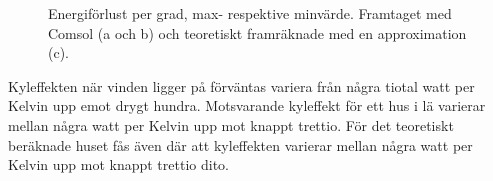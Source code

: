 \begin{figure}[hpbt]
\centering
{}
\vspace{5mm}


\caption{\label{fig:windenergyloss}Energiförlust per grad, max- respektive minvärde.
Framtaget med Comsol (a och b) och teoretiskt framräknade med en approximation (c).}
\end{figure}

Kyleffekten när vinden ligger på förväntas variera från några tiotal watt per Kelvin upp emot drygt hundra. Motsvarande kyleffekt för ett hus i lä varierar mellan några watt per Kelvin upp mot knappt trettio. För det teoretiskt beräknade huset fås även där att kyleffekten varierar mellan några watt per Kelvin upp mot knappt trettio dito.

